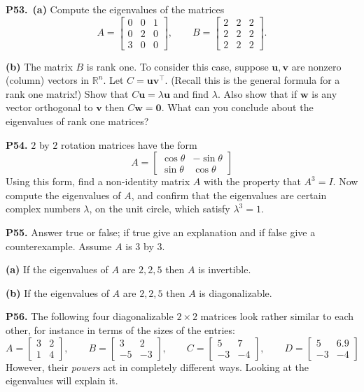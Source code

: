 \documentclass[12pt]{amsart}
\newcommand{\bu}{\bm{u}}
\newcommand{\bv}{\bm{v}}
\newcommand{\bw}{\bm{w}}
\newcommand{\bzero}{\bm{0}}
\newcommand{\RR}{\mathbb{R}}
\newcommand{\prob}[1]{\bigskip\noindent\textbf{#1.}\quad }
\newcommand{\epart}[1]{\medskip\noindent\textbf{(#1)}\quad }
\newcommand{\ppart}[1]{\,\textbf{(#1)}\quad }
\begin{document}
\prob{P53}  \ppart{a}  Compute the eigenvalues of the matrices
    $$A = \begin{bmatrix} 0 & 0 & 1 \\ 0 & 2 & 0 \\ 3 & 0 & 0 \end{bmatrix}, \qquad B = \begin{bmatrix} 2 & 2 & 2 \\ 2 & 2 & 2 \\ 2 & 2 & 2 \end{bmatrix}.$$

\epart{b}  The matrix $B$ is rank one.  To consider this case, suppose $\bu,\bv$ are nonzero (column) vectors in $\RR^n$.  Let $C = \bu \bv^\top$.  (Recall this is the general formula for a rank one matrix!)  Show that $C \bu = \lambda \bu$ and find $\lambda$.  Also show that if $\bw$ is any vector orthogonal to $\bv$ then $C \bw = \bzero$.  What can you conclude about the eigenvalues of rank one matrices?


\prob{P54}  $2$ by $2$ rotation matrices have the form
    $$A = \begin{bmatrix} \cos \theta & - \sin \theta \\ \sin \theta & \cos \theta \end{bmatrix}$$
Using this form, find a non-identity matrix $A$ with the property that $A^3=I$.  Now compute the eigenvalues of $A$, and confirm that the eigenvalues are certain complex numbers $\lambda$, on the unit circle, which satisfy $\lambda^3=1$.


\prob{P55}  Answer true or false; if true give an explanation and if false give a counterexample.  Assume $A$ is $3$ by $3$.

\epart{a}  If the eigenvalues of $A$ are $2,2,5$ then $A$ is invertible.

\epart{b}  If the eigenvalues of $A$ are $2,2,5$ then $A$ is diagonalizable.


\prob{P56}  The following four diagonalizable $2\times 2$ matrices look rather similar to each other, for instance in terms of the sizes of the entries:
    $$A = \begin{bmatrix} 3 & 2 \\ 1 & 4 \end{bmatrix}, \qquad B = \begin{bmatrix} 3 & 2 \\ -5 & -3 \end{bmatrix}, \qquad C = \begin{bmatrix} 5 & 7 \\ -3 & -4 \end{bmatrix}, \qquad D = \begin{bmatrix} 5 & 6.9 \\ -3 & -4 \end{bmatrix}$$
However, their \emph{powers} act in completely different ways.  Looking at the eigenvalues will explain it.
\end{document}
